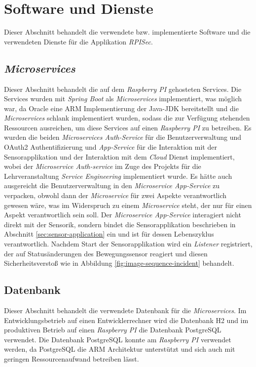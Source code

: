 
\section{Software und Dienste}
Dieser Abschnitt behandelt die verwendete bzw. implementierte Software und die verwendeten Dienste für die Applikation \emph{RPISec}.

\subsection{\emph{Microservices}}
Dieser Abschnitt behandelt die auf dem \emph{Raspberry PI} gehosteten Services. Die Services wurden mit \emph{Spring Boot} als \emph{Microservices} implementiert, was möglich war, da Oracle eine ARM Implementierung der Java-JDK bereitstellt und die \emph{Microservices} schlank implementiert wurden, sodass die zur Verfügung stehenden Ressourcen ausreichen, um diese Services auf einen \emph{Raspberry PI} zu betreiben.
\newline
\newline
Es wurden die beiden \emph{Microservices Auth-Service} für die Benutzerverwaltung und OAuth2 Authentifizierung und \emph{App-Service} für die Interaktion mit der Sensorapplikation und der Interaktion mit dem \emph{Cloud} Dienst implementiert, wobei der \emph{Microservice Auth-service} im Zuge des Projekts für die Lehrveranstaltung \emph{Service Engineering} implementiert wurde. Es hätte auch ausgereicht die Benutzerverwaltung in den \emph{Microservice App-Service} zu verpacken, obwohl dann der \emph{Microservice} für zwei Aspekte verantwortlich gewesen wäre, was im Widerspruch zu einem \emph{Microservice} steht, der nur für einen Aspekt verantwortlich sein soll. 
\newline
\newline
Der \emph{Microservice App-Service} interagiert nicht direkt mit der Sensorik, sondern bindet die Sensorapplikation beschrieben in Abschnitt \ref{sec:sensor-application} ein und ist für dessen Lebenszyklus verantwortlich. Nachdem Start der Sensorapplikation wird ein \emph{Listener} registriert, der auf Statusänderungen des Bewegungssensor reagiert und diesen Sicherheitsverstoß wie in Abbildung \ref{fig:image-sequence-incident} behandelt.

\subsection{Datenbank}
Dieser Abschnitt behandelt die verwendete Datenbank für die \emph{Microservices}. Im Entwicklungsbetrieb auf einen Entwicklerrechner wird die Datenbank H2 und im produktiven Betrieb auf einen \emph{Raspberry PI} die Datenbank PostgreSQL verwendet. Die Datenbank PostgreSQL konnte am \emph{Raspberry PI} verwendet werden, da PostgreSQL die ARM Architektur unterstützt und sich auch mit geringen Ressourcenaufwand betreiben lässt.


